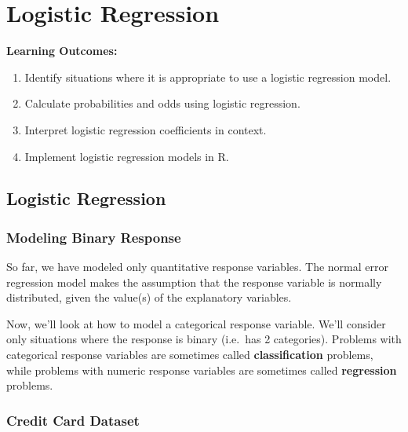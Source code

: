 \documentclass[
  letterpaper,
  DIV=11,
  numbers=noendperiod]{scrreprt}
\providecommand{\tightlist}{%
  \setlength{\itemsep}{0pt}\setlength{\parskip}{0pt}}\usepackage{longtable,booktabs,array}
\begin{document}

\chapter{Logistic Regression}\label{logistic-regression}

\textbf{Learning Outcomes:}

\begin{enumerate}
\def\labelenumi{\arabic{enumi}.}
\setcounter{enumi}{36}
\tightlist
\item
  Identify situations where it is appropriate to use a logistic
  regression model.\\
\item
  Calculate probabilities and odds using logistic regression.\\
\item
  Interpret logistic regression coefficients in context.\\
\item
  Implement logistic regression models in R.
\end{enumerate}

\section{Logistic Regression}\label{logistic-regression-1}

\subsection{Modeling Binary Response}\label{modeling-binary-response}

So far, we have modeled only quantitative response variables. The normal
error regression model makes the assumption that the response variable
is normally distributed, given the value(s) of the explanatory
variables.

Now, we'll look at how to model a categorical response variable. We'll
consider only situations where the response is binary (i.e.~has 2
categories). Problems with categorical response variables are sometimes
called \textbf{classification} problems, while problems with numeric
response variables are sometimes called \textbf{regression} problems.

\subsection{Credit Card Dataset}\label{credit-card-dataset}
\end{document}
